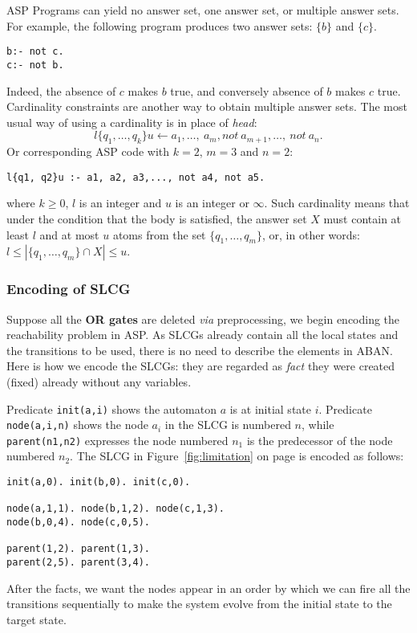 ASP Programs can yield no answer set, one answer set, or multiple answer sets. 
For example, the following program produces two answer sets: $\{b\}$ and $\{c\}$.

\begin{Verbatim}[commandchars=\\\{\}]
b:- not c. 
c:- not b.
\end{Verbatim}

Indeed, the absence of $c$ makes $b$ true, and conversely absence of $b$ makes $c$ true. 
Cardinality constraints are another way to obtain multiple answer sets. 
The most usual way of using a cardinality is in place of \textit{head}:
$$l \{q_1, \ldots , q_k \} u \gets a_1, \ldots ,\ a_m, not\ a_{m+1}, \ldots ,\ not\ a_n.$$
Or corresponding ASP code with $k=2$, $m=3$ and $n=2$:
\begin{verbatim}
l{q1, q2}u :- a1, a2, a3,..., not a4, not a5.
\end{verbatim}
where $k \geq 0$, $l$ is an integer and $u$ is an integer or $\infty$. 
Such cardinality means that under the condition that the body is satisfied, the answer set $X$ must contain at least $l$ and at most $u$ atoms from the set $\{q_1, \ldots  , q_m\}$, or, in other words: $l \leq |\{q_1, \ldots  , q_m\} \cap X| \leq u$. %

\subsubsection{Encoding of SLCG}

Suppose all the \textbf{OR gates} are deleted \textit{via} preprocessing, we begin encoding the reachability problem in ASP.
As SLCGs already contain all the local states and the transitions to be used, there is no need to describe the elements in ABAN.
Here is how we encode the SLCGs: they are regarded as \textit{fact} they were created (fixed) already without any variables.

Predicate \texttt{init(a,i)} shows the automaton $a$ is at initial state $i$. %
Predicate \texttt{node(a,i,n)} shows the node $a_i$ in the SLCG is numbered $n$, while \texttt{parent(n1,n2)} expresses the node numbered $n_1$ is the predecessor of the node numbered $n_2$.
The SLCG in Figure~\ref{fig:limitation} on page \pageref{fig:limitation} is encoded as follows:
\begin{Verbatim}[commandchars=\\\{\}]
init(a,0). init(b,0). init(c,0).

node(a,1,1). node(b,1,2). node(c,1,3).
node(b,0,4). node(c,0,5).

parent(1,2). parent(1,3).
parent(2,5). parent(3,4).
\end{Verbatim}
After the facts, we want the nodes appear in an order by which we can fire all the transitions sequentially to make the system evolve from the initial state to the target state. 

